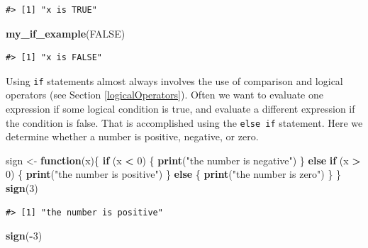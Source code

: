 \documentclass[
  11pt,
]{krantz}
\newenvironment{Shaded}{\begin{snugshade}}{\end{snugshade}}
\newcommand{\ControlFlowTok}[1]{\textcolor[rgb]{0.13,0.29,0.53}{\textbf{#1}}}
\newcommand{\DecValTok}[1]{\textcolor[rgb]{0.00,0.00,0.81}{#1}}
\newcommand{\KeywordTok}[1]{\textcolor[rgb]{0.13,0.29,0.53}{\textbf{#1}}}
\newcommand{\NormalTok}[1]{#1}
\newcommand{\OperatorTok}[1]{\textcolor[rgb]{0.81,0.36,0.00}{\textbf{#1}}}
\newcommand{\OtherTok}[1]{\textcolor[rgb]{0.56,0.35,0.01}{#1}}
\newcommand{\StringTok}[1]{\textcolor[rgb]{0.31,0.60,0.02}{#1}}
\theoremstyle{definition}
\theoremstyle{definition}
\theoremstyle{definition}
\theoremstyle{definition}
\theoremstyle{remark}
\begin{document}
\begin{verbatim}
#> [1] "x is TRUE"
\end{verbatim}

\begin{Shaded}
\begin{Highlighting}[]
\KeywordTok{my\_if\_example}\NormalTok{(}\OtherTok{FALSE}\NormalTok{)}
\end{Highlighting}
\end{Shaded}

\begin{verbatim}
#> [1] "x is FALSE"
\end{verbatim}

Using \texttt{if} statements almost always involves the use of comparison and logical operators (see Section \ref{logicalOperators}). Often we want to evaluate one expression if some logical condition is true, and evaluate a different expression if the condition is false. That is accomplished using the \texttt{else\ if} statement. Here we determine whether a number is positive, negative, or zero.

\begin{Shaded}
\begin{Highlighting}[]
\NormalTok{sign \textless{}{-}}\StringTok{ }\ControlFlowTok{function}\NormalTok{(x)\{}
  \ControlFlowTok{if}\NormalTok{ (x }\OperatorTok{\textless{}}\StringTok{ }\DecValTok{0}\NormalTok{) \{}
    \KeywordTok{print}\NormalTok{(}\StringTok{"the number is negative"}\NormalTok{)}
\NormalTok{  \} }\ControlFlowTok{else} \ControlFlowTok{if}\NormalTok{ (x }\OperatorTok{\textgreater{}}\StringTok{ }\DecValTok{0}\NormalTok{) \{}
      \KeywordTok{print}\NormalTok{(}\StringTok{"the number is positive"}\NormalTok{)}
\NormalTok{  \} }\ControlFlowTok{else}\NormalTok{ \{}
      \KeywordTok{print}\NormalTok{(}\StringTok{"the number is zero"}\NormalTok{)}
\NormalTok{  \}}
\NormalTok{\}}
\KeywordTok{sign}\NormalTok{(}\DecValTok{3}\NormalTok{)}
\end{Highlighting}
\end{Shaded}

\begin{verbatim}
#> [1] "the number is positive"
\end{verbatim}

\begin{Shaded}
\begin{Highlighting}[]
\KeywordTok{sign}\NormalTok{(}\OperatorTok{{-}}\DecValTok{3}\NormalTok{)}
\end{Highlighting}
\end{Shaded}
\end{document}
